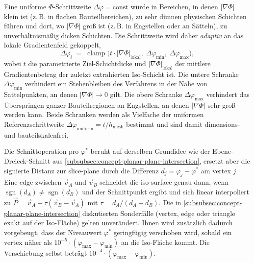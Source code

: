                 Eine uniforme $\Phi$-Schrittweite $\Delta\varphi = \text{const}$ würde in Bereichen, in denen $|\nabla\Phi|$ klein ist (z.\,B. in flachen Bauteilbereichen), zu sehr dünnen physischen Schichten führen und dort, wo $|\nabla\Phi|$ groß ist (z.\,B. in Engstellen oder an Sätteln), zu unverhältnismäßig dicken Schichten.
                Die Schrittweite wird daher \emph{adaptiv} an das lokale Gradientenfeld gekoppelt,
                \begin{equation}
                    \Delta\varphi_i \;=\; \operatorname{clamp}\bigl(t \cdot |\nabla\Phi|_\text{lokal},\; \Delta\varphi_\text{min},\; \Delta\varphi_\text{max}\bigr),
                    \label{eq:concept-crystal-adaptive-step}
                \end{equation}
                wobei $t$ die parametrierte Ziel-Schichtdicke und $|\nabla\Phi|_\text{lokal}$ der mittlere Gradientenbetrag der zuletzt extrahierten Iso-Schicht ist.
                Die untere Schranke $\Delta\varphi_\text{min}$ verhindert ein Stehenbleiben des Verfahrens in der Nähe von Sattelpunkten, an denen $|\nabla\Phi| \to 0$ gilt.
                Die obere Schranke $\Delta\varphi_\text{max}$ verhindert das Überspringen ganzer Bauteilregionen an Engstellen, an denen $|\nabla\Phi|$ sehr groß werden kann.
                Beide Schranken werden als Vielfache der uniformen Referenzschrittweite $\Delta\varphi_\text{uniform} = t/h_\text{mesh}$ bestimmt und sind damit dimensions- und bauteilskalenfrei.

                Die Schnittoperation pro $\varphi^*$ beruht auf derselben Grundidee wie der Ebene-Dreieck-Schnitt aus \cref{subsubsec:concept-planar-plane-intersection}, ersetzt aber die signierte Distanz zur \gls{slice-plane} durch die Differenz $d_j = \varphi_j - \varphi^*$ am \gls{vertex} $j$.
                Eine \gls{edge} zwischen $\vec{v}_A$ und $\vec{v}_B$ schneidet die \gls{iso-surface} genau dann, wenn $\operatorname{sgn}(d_A) \neq \operatorname{sgn}(d_B)$ und der Schnittpunkt ergibt und sich linear interpoliert zu $\vec{P} = \vec{v}_A + \tau (\vec{v}_B - \vec{v}_A)$ mit $\tau = d_A / (d_A - d_B)$.
                Die in \cref{subsubsec:concept-planar-plane-intersection} diskutierten Sonderfälle (\gls{vertex}, \gls{edge} oder \gls{triangle} exakt auf der Iso-Fläche) gelten unverändert.
                Ihnen wird zusätzlich dadurch vorgebeugt, dass der Niveauwert $\varphi^*$ geringfügig verschoben wird, sobald ein \gls{vertex} näher als $10^{-5} \cdot (\varphi_{\max} - \varphi_{\min})$ an die Iso-Fläche kommt.
                Die Verschiebung selbst beträgt $10^{-4} \cdot (\varphi_{\max} - \varphi_{\min})$.

